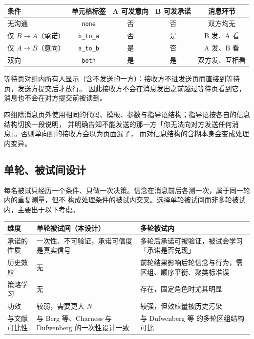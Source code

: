 \documentclass[10pt,a4paper]{ctexart}
\newcommand{\code}[1]{\texttt{#1}}
\begin{document}
\begin{table}[h]
\centering\small
\begin{tabular}{lcccc}
\toprule
条件 & 单元格标签 & A 可发意向 & B 可发承诺 & 消息环节 \\
\midrule
无沟通 & \code{none} & 否 & 否 & 双方均无 \\
仅 $B\!\rightarrow\!A$（承诺） & \code{b\_to\_a} & 否 & 是 & B 发、A 看 \\
仅 $A\!\rightarrow\!B$（意向） & \code{a\_to\_b} & 是 & 否 & A 发、B 看 \\
双向 & \code{both} & 是 & 是 & 双方发、互相看 \\
\bottomrule
\end{tabular}
\end{table}

等待页对组内所有人显示（含不发送的一方）：接收方不进发送页而直接到等待页，发送方提交后才放行。
因此接收方不会在消息发出之前越过等待页看到它，消息也不会在对方提交前被读到。

四组除消息页外使用相同的代码、模板、参数与指导语结构；指导语按各自的信息结构切换一段说明，
并明确告知不能发送的那一方「你无法向对方发送任何消息」。否则单向组的接收方会以为页面漏了，
而对信息结构的含糊本身会变成处理内变异。

\subsection{单轮、被试间设计}

每名被试只经历一个条件、只做一次决策。信念在消息前后各测一次，属于同一轮内的重复测量，但不
构成处理条件的被试内交叉。选择单轮被试间而非多轮被试内，主要出于以下考虑。

\begin{table}[h]
\centering\small
\begin{tabular}{p{2.9cm}p{5.6cm}p{5.6cm}}
\toprule
维度 & 单轮被试间（本设计） & 多轮被试内 \\
\midrule
承诺的性质 & 一次性、不可验证，承诺可信度是真实信号 & 多轮后承诺可被验证，被试会学习「承诺是否兑现」 \\
历史效应 & 无 & 前轮结果影响后轮信念与行为，需区组、顺序平衡、聚类标准误 \\
策略学习 & 无 & 存在，固定角色时尤其明显 \\
功效 & 较弱，需要更大 $N$ & 较强，但效应量被历史污染 \\
与文献可比性 & 与 Berg 等\cite{berg1995}、Charness 与 Dufwenberg\cite{charness2006} 的一次性设计一致 & 与 Dufwenberg 等\cite{dufwenberg2026} 的多轮区组结构可比 \\
\bottomrule
\end{tabular}
\end{table}
\end{document}

